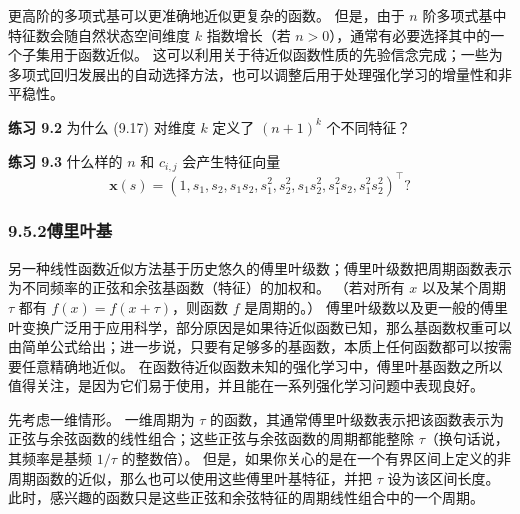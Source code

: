 \documentclass[UTF8,12pt,a4paper,fontset=fandol]{ctexart}
\begin{document}
\begin{center}
\end{center}

更高阶的多项式基可以更准确地近似更复杂的函数。
但是，由于 $n$ 阶多项式基中特征数会随自然状态空间维度 $k$ 指数增长（若 $n>0$），通常有必要选择其中的一个子集用于函数近似。
这可以利用关于待近似函数性质的先验信念完成；一些为多项式回归发展出的自动选择方法，也可以调整后用于处理强化学习的增量性和非平稳性。

\noindent\textbf{练习 9.2}
为什么 (9.17) 对维度 $k$ 定义了 $(n+1)^k$ 个不同特征？

\noindent\textbf{练习 9.3}
什么样的 $n$ 和 $c_{i,j}$ 会产生特征向量
\[
\mathbf{x}(s)=(1,s_1,s_2,s_1s_2,s_1^2,s_2^2,s_1s_2^2,s_1^2s_2,s_1^2s_2^2)^\top?
\]

\subsubsection*{9.5.2\quad 傅里叶基}

另一种线性函数近似方法基于历史悠久的傅里叶级数；傅里叶级数把周期函数表示为不同频率的正弦和余弦基函数（特征）的加权和。
（若对所有 $x$ 以及某个周期 $\tau$ 都有 $f(x)=f(x+\tau)$，则函数 $f$ 是周期的。）
傅里叶级数以及更一般的傅里叶变换广泛用于应用科学，部分原因是如果待近似函数已知，那么基函数权重可以由简单公式给出；进一步说，只要有足够多的基函数，本质上任何函数都可以按需要任意精确地近似。
在函数待近似函数未知的强化学习中，傅里叶基函数之所以值得关注，是因为它们易于使用，并且能在一系列强化学习问题中表现良好。

先考虑一维情形。
一维周期为 $\tau$ 的函数，其通常傅里叶级数表示把该函数表示为正弦与余弦函数的线性组合；这些正弦与余弦函数的周期都能整除 $\tau$（换句话说，其频率是基频 $1/\tau$ 的整数倍）。
但是，如果你关心的是在一个有界区间上定义的非周期函数的近似，那么也可以使用这些傅里叶基特征，并把 $\tau$ 设为该区间长度。
此时，感兴趣的函数只是这些正弦和余弦特征的周期线性组合中的一个周期。
\end{document}
